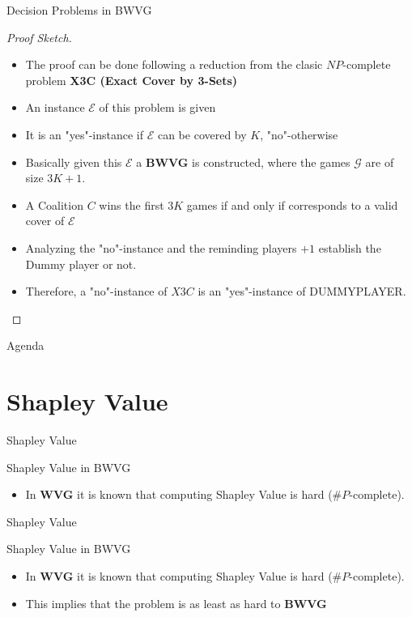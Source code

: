 \documentclass{beamer}
\begin{document}
\begin{frame}[fragile]{Decision Problems in BWVG}
  \begin{proof}[Proof Sketch]
    \begin{itemize}
      \item The proof can be done following a reduction from the clasic $NP$-complete problem \textbf{X3C (Exact Cover by 3-Sets)}
      \item An instance $\mathcal{E}$ of this problem is given
      \item It is an "yes"-instance if $\mathcal{E}$ can be covered by $K$, "no"-otherwise
      \item Basically given this $\mathcal{E}$ a \textbf{BWVG} is constructed, where the games $\mathcal{G}$ are of size $3K+1$.
      \item A Coalition $C$ wins the first $3K$ games if and only if corresponds to a valid cover of $\mathcal{E}$
      \item Analyzing the "no"-instance and the reminding players $+1$ establish the Dummy player or not. 
      \item Therefore, a "no"-instance of $X3C$ is an "yes"-instance of DUMMYPLAYER.
    \end{itemize}
  \end{proof}
\end{frame}


\begin{frame}[fragile]{Agenda}
  \section{Shapley Value}
  \tableofcontents[currentsection]
\end{frame}

\begin{frame}[fragile]{Shapley Value}
  \begin{block}{Shapley Value in BWVG}
    \begin{itemize}
      \item In \textbf{WVG} it is known that computing Shapley Value is hard ($\# P$-complete).
    \end{itemize}
  \end{block}
\end{frame}

\begin{frame}[fragile]{Shapley Value}
  \begin{block}{Shapley Value in BWVG}
    \begin{itemize}
      \item In \textbf{WVG} it is known that computing Shapley Value is hard ($\# P$-complete).
      \item This implies that the problem is as least as hard to \textbf{BWVG}
    \end{itemize}
  \end{block}
\end{frame}
\end{document}
